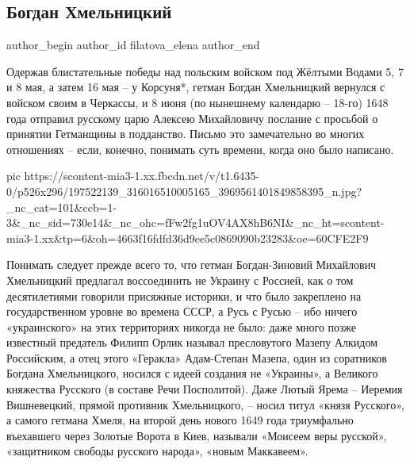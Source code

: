  
 
 
 
 
 
\subsection{Богдан Хмельницкий}
\label{sec:08_06_2021.fb.filatova_elena.1.bogdan_hmelnickij}
\ifcmt
 author_begin
   author_id filatova_elena
 author_end
\fi

Одержав блистательные победы над польским войском под Жёлтыми Водами  5, 7 и 8
мая, а затем 16 мая – у Корсуня*, гетман Богдан Хмельницкий вернулся с войском
своим в Черкассы, и 8 июня (по нынешнему календарю – 18-го) 1648 года отправил
русскому царю Алексею Михайловичу послание с просьбой о принятии Гетманщины в
подданство. Письмо это замечательно во многих отношениях – если, конечно,
понимать суть времени, когда оно было написано.

\ifcmt
  pic https://scontent-mia3-1.xx.fbcdn.net/v/t1.6435-0/p526x296/197522139_316016510005165_3969561401849858395_n.jpg?_nc_cat=101&ccb=1-3&_nc_sid=730e14&_nc_ohc=fFw2fg1uOV4AX8hB6NI&_nc_ht=scontent-mia3-1.xx&tp=6&oh=4663f16fdfd36d9ee5c0869090b23283&oe=60CFE2F9
\fi

Понимать следует прежде всего то, что гетман Богдан-Зиновий Михайлович
Хмельницкий предлагал воссоединить не Украину с Россией, как о том
десятилетиями говорили присяжные историки, и что было закреплено на
государственном уровне во времена СССР, а Русь с Русью – ибо ничего
«украинского» на этих территориях никогда не было: даже много позже известный
предатель Филипп Орлик называл пресловутого Мазепу  Алкидом Российским, а отец
этого «Геракла» Адам-Степан Мазепа, один из соратников Богдана Хмельницкого,
носился с идеей создания не «Украины», а Великого княжества Русского (в составе
Речи Посполитой). Даже Лютый Ярема – Иеремия Вишневецкий, прямой противник
Хмельницкого, – носил титул «князя Русского», а самого гетмана Хмеля, на второй
день нового 1649 года триумфально въехавшего через Золотые Ворота в Киев,
называли «Моисеем веры русской», «защитником свободы русского народа», «новым
Маккавеем».

